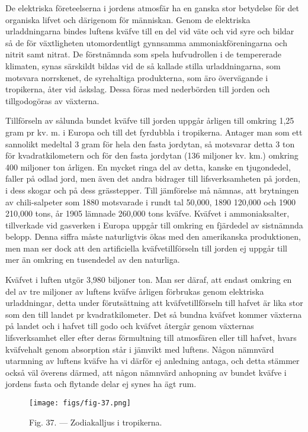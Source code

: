 \documentclass[a4paper, 12pt, oneside, swedish]{article}
\begin{document}
De elektriska företeelserna i jordens atmosfär ha en ganska stor betydelse för det organiska lifvet och därigenom för människan. Genom de elektriska urladdningarna bindes luftens kväfve till en del vid väte och vid syre och bildar så de för växtligheten utomordentligt gynnsamma ammoniakföreningarna och nitrit samt nitrat. De förstnämnda som spela hufvudrollen i de tempererade klimaten, synas särskildt bildas vid de så kallade stilla urladdningarna, som motsvara norrskenet, de syrehaltiga produkterna, som äro övervägande i tropikerna, åter vid åskslag. Dessa föras med nederbörden till jorden och tillgodogöras av växterna.

Tillförseln av sålunda bundet kväfve till jorden uppgår årligen till omkring 1,25 gram pr kv. m. i Europa och till det fyrdubbla i tropikerna. Antager man som ett sannolikt medeltal 3 gram för hela den fasta jordytan, så motsvarar detta 3 ton för kvadratkilometern och för den fasta jordytan (136 miljoner kv. km.) omkring 400 miljoner ton årligen. En mycket ringa del av detta, kanske en tjugondedel, faller på odlad jord, men även det andra bidrager till lifsverksamheten på jorden, i dess skogar och på dess grässtepper. Till jämförelse må nämnas, att brytningen av chili-salpeter som 1880 motsvarade i rundt tal 50,000, 1890 120,000 och 1900 210,000 tons, år 1905 lämnade 260,000 tons kväfve. Kväfvet i ammoniaksalter, tillverkade vid gasverken i Europa uppgår till omkring en fjärdedel av sistnämnda belopp. Denna siffra måste naturligtvis ökas med den amerikanska produktionen, men man ser dock att den artificiella kväfvetillförseln till jorden ej uppgår till mer än omkring en tusendedel av den naturliga.

Kväfvet i luften utgör 3,980 biljoner ton. Man ser däraf, att endast omkring en del av tre miljoner av luftens kväfve årligen förbrukas genom elektriska urladdningar, detta under förutsättning att kväfvetillförseln till hafvet är lika stor som den till landet pr kvadratkilometer. Det så bundna kväfvet kommer växterna på landet och i hafvet till godo och kväfvet återgår genom växternas lifsverksamhet eller efter deras förmultning till atmosfären eller till hafvet, hvars kväfvehalt genom absorption står i jämvikt med luftens. Någon nämnvärd utarmning av luftens kväfve ha vi därför ej anledning antaga, och detta stämmer också väl överens därmed, att någon nämnvärd anhopning av bundet kväfve i jordens fasta och flytande delar ej synes ha ägt rum.

\begin{figure}[H]
\centering
\texttt{[image: figs/fig-37.png]}
\caption{Fig. 37. --- Zodiakalljus i tropikerna.}
\end{figure}
\end{document}

